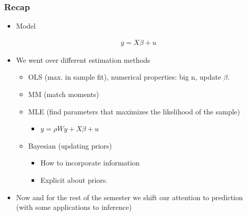 \documentclass[
  shownotes,
  xcolor={svgnames},
  hyperref={colorlinks,citecolor=DarkBlue,linkcolor=DarkRed,urlcolor=DarkBlue}
  , aspectratio=169]{beamer}
\begin{document}
\begin{frame}
\frametitle{Recap}

\begin{itemize} 
    \item Model

    \begin{align}
    y = X \beta + u
    \end{align}
    
    \item We went over different estimation methods
    \begin{itemize} 
      \item OLS (max. in sample fit), numerical properties: big n, update $\beta$.
      \medskip
      \item MM (match moments)
      \medskip
      \item MLE (find parameters that maximizes the likelihood of the sample)
      \medskip
      \begin{itemize}
        \item $y = \rho Wy + X\beta + u$
      \end{itemize}
      \item Bayesian (updating priors)
      \medskip
      \begin{itemize}
        \item How to incorporate information
        \item Explicit about priors.
      \end{itemize}
    \end{itemize}    
    \medskip
    \item Now and for the rest of the semester we shift our attention to prediction (with some applications to inference)
\end{itemize}
\end{frame}
\end{document}
